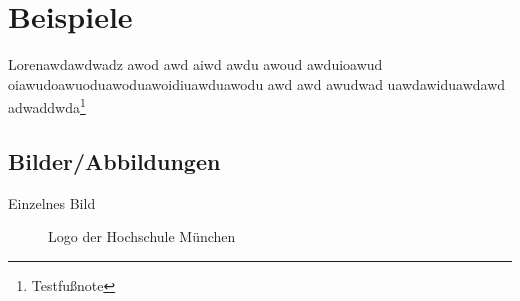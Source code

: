\documentclass[\mainsize, a4paper, fleqn, xcolor=dvipsnames]{scrartcl}
\begin{document}
	\renewcommand{\sectionautorefname}{Kapitel}
	\renewcommand{\subsectionautorefname}{Abschnitt}
	\renewcommand{\subsubsectionautorefname}{Unterabschnitt}
	
	
	
	
	\restoregeometry
	
	\newpage
	\thispagestyle{empty}
	\mbox{}
	\newpage
	
	\pagestyle{fancy}
	
	

	\section{Beispiele}\label{sec:beispiel}
	
	Lorenawdawdwadz awod awd aiwd awdu awoud awduioawud oiawudoawuoduawoduawoidiuawduawodu awd awd awudwad uawdawiduawdawd adwaddwda\footnote{Testfußnote}
	
	\subsection{Bilder/Abbildungen}\label{subsec:abbildungen}
	
	Einzelnes Bild
	
	\begin{figure}[h]
		\centering
		\begin{minipage}{0.6\textwidth}
			\centering
		\end{minipage}
		\caption{Logo der Hochschule München}
  		\label{fig:logo}
	\end{figure}
	
\end{document}
